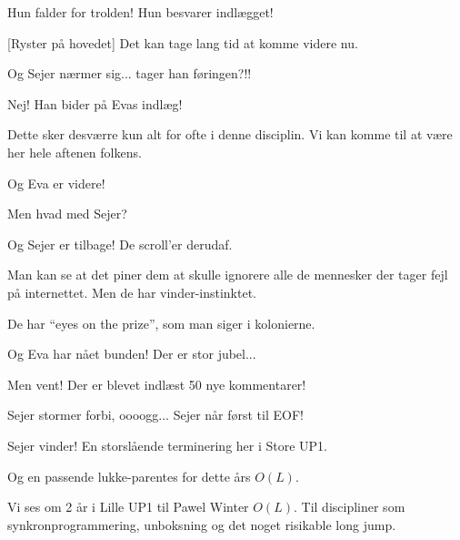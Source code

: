 \documentclass[a4paper,11pt]{article}
\begin{document}
\begin{sketch}
   Hun falder for trolden! Hun besvarer indlægget!


  [Ryster på hovedet] Det kan tage lang tid at komme videre nu.


    Og Sejer nærmer sig... tager han føringen?!!


    Nej! Han bider på Evas indlæg!




     Dette sker desværre kun alt for ofte i denne disciplin. Vi kan
   komme til at være her hele aftenen folkens.


    Og Eva er videre!

    Men hvad med Sejer?


    Og Sejer er tilbage! De scroll'er derudaf.

    Man kan se at det piner dem at skulle ignorere alle de mennesker
   der tager fejl på internettet. Men de har vinder-instinktet.

    De har "`eyes on the prize"', som man siger i kolonierne.


    Og Eva har nået bunden! Der er stor jubel...

    Men vent! Der er blevet indlæst 50 nye kommentarer!

    Sejer stormer forbi, oooogg... Sejer når først til EOF!

    Sejer vinder! En storslående terminering her i Store UP1.

    Og en passende lukke-parentes for dette års $O(L)$.

    Vi ses om 2 år i Lille UP1 til Pawel Winter $O(L)$. Til discipliner
    som synkronprogrammering, unboksning og det noget risikable long jump.


\end{sketch}
\end{document}
